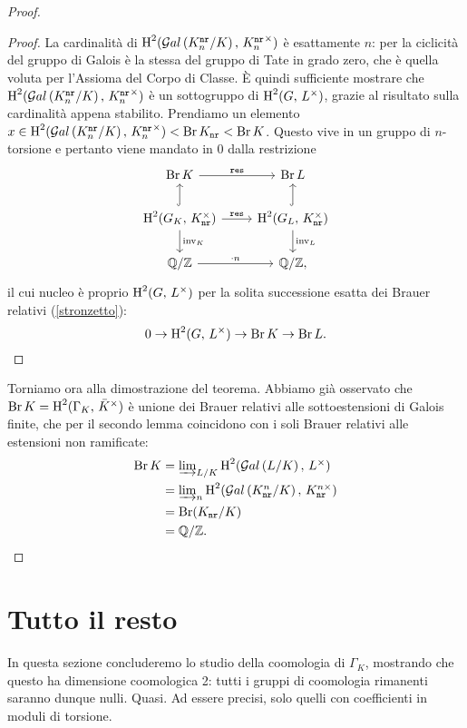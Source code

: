 \begin{proof}
\begin{proof}
	La cardinalità di $ \operatorname{H}^2(\mathcal{G}al\left( {K^\mathtt{nr}_n}/K \right),\, {K^\mathtt{nr}_n}^{\times}) $ è esattamente $ n $: per la ciclicità del gruppo di Galois è la stessa del gruppo di Tate in grado zero, che è quella voluta per l'Assioma del Corpo di Classe. È quindi sufficiente mostrare che $ \operatorname{H}^2(\mathcal{G}al\left( {K^\mathtt{nr}_n}/K \right),\, {K^\mathtt{nr}_n}^{\times}) $ è un sottogruppo di $ \operatorname{H}^2(G,\, L^\times ) $, grazie al risultato sulla cardinalità appena stabilito.
	Prendiamo un elemento $ x \in \operatorname{H}^2(\mathcal{G}al\left( {K^\mathtt{nr}_n}/K \right),\, {K^\mathtt{nr}_n}^{\times}) < \operatorname{Br} K_\mathtt{nr} < \operatorname{Br} K $. Questo vive in un gruppo di $ n $-torsione e pertanto viene mandato in $ 0 $ dalla restrizione
	\[ \begin{tikzcd}
	\Br \K \rar["\Res"]
	& \Br L \\
	\HH^2(G_\K, \, \knr^\times) \rar["\Res"] \dar["\inv_\K"] \arrow[hook]{u}
	& \HH^2(G_L, \, \knr^\times) \dar["\inv_L"] \arrow[hook]{u} \\
	\Q/\Z \rar["\cdot n"]
	& \Q/\Z,
	\end{tikzcd} \]
	il cui nucleo è proprio $ \operatorname{H}^2(G, \, L^\times) $ per la solita successione esatta dei Brauer relativi (\ref{stronzetto}):
	\[ 0 \to \operatorname{H}^2(G, \, L^\times) \to \operatorname{Br} K \to \operatorname{Br} L. \qedhere \]
\end{proof}

Torniamo ora alla dimostrazione del teorema. Abbiamo già osservato che $ \operatorname{Br} K = \operatorname{H}^2(\Gamma_K, \, \bar{K}^\times) $ è unione dei Brauer relativi alle sottoestensioni di Galois finite, che per il secondo lemma coincidono con i soli Brauer relativi alle estensioni non ramificate:
\begin{align*}
	\operatorname{Br} K &= \textstyle\varinjlim_{L/K} \operatorname{H}^2(\mathcal{G}al\left( L/K \right), \, L^\times)\\
	&= \textstyle\varinjlim_{n} \operatorname{H}^2(\mathcal{G}al\left( K_\mathtt{nr}^n/K \right),\, K_\mathtt{nr}^{n\times})\\
	&= \operatorname{Br} (K_\mathtt{nr} /K)\\
	&= \mathbb{Q}/\mathbb{Z}. \qedhere
\end{align*}

\end{proof}

\section{Tutto il resto}
In questa sezione concluderemo lo studio della coomologia di $ \Gamma_K $, mostrando che questo ha dimensione coomologica 2: tutti i gruppi di coomologia rimanenti saranno dunque nulli. Quasi. Ad essere precisi, solo quelli con coefficienti in moduli di torsione.

